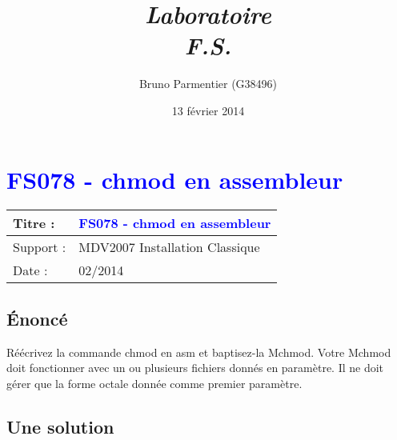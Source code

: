 \documentclass[french,10pt,A4]{report}
\begin{document}
\rfoot{\today}
\cfoot{ }
\renewcommand{\footrulewidth}{0.4pt}

\setlength{\parindent}{0pt} %

\lstset{frame=trBL}

\setcounter{tocdepth}{1}    %
\setcounter{secnumdepth}{5} %

\newcommand{\titre}{Titre du sujet} %

\thispagestyle{empty}

\title{\emph{Laboratoire\\\textbf{F.S.}}}
\author{Bruno Parmentier (G38496)}
\date{13 février 2014}
\maketitle
\newpage
%
\renewcommand{\titre}{\textcolor{blue}{ FS078 - chmod en assembleur }}

\lhead{ \titre }
\section{{\titre} }

\begin{tabular}{|l|l|}
\hline
Titre : 	& \titre \\\hline
Support : 	& MDV2007 Installation Classique \\\hline
Date :		& 02/2014 \\\hline
\end{tabular}

\subsection{Énoncé}

Réécrivez la commande chmod en asm et baptisez-la Mchmod. Votre Mchmod doit
fonctionner avec un ou plusieurs fichiers donnés en paramètre. Il ne doit gérer
que la forme octale donnée comme premier paramètre.

\subsection{Une solution}
\end{document}
